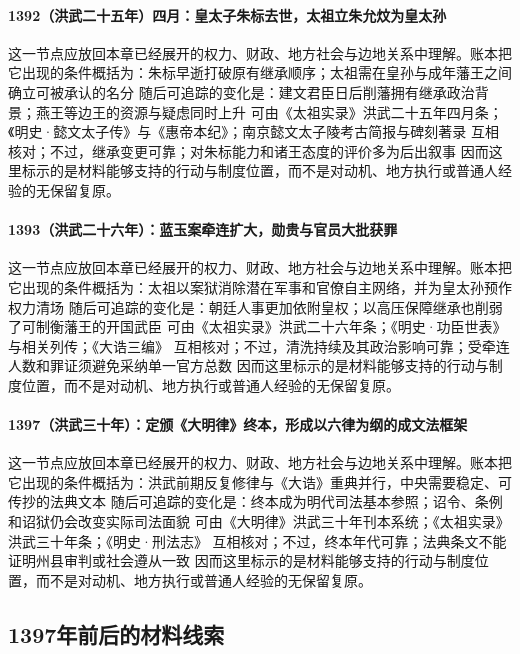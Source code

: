 \paragraph{1392（洪武二十五年）四月：皇太子朱标去世，太祖立朱允炆为皇太孙} 这一节点应放回本章已经展开的权力、财政、地方社会与边地关系中理解。账本把它出现的条件概括为：朱标早逝打破原有继承顺序；太祖需在皇孙与成年藩王之间确立可被承认的名分 随后可追踪的变化是：建文君臣日后削藩拥有继承政治背景；燕王等边王的资源与疑虑同时上升 可由《太祖实录》洪武二十五年四月条；《明史·懿文太子传》与《惠帝本纪》；南京懿文太子陵考古简报与碑刻著录 互相核对；不过，继承变更可靠；对朱标能力和诸王态度的评价多为后出叙事 因而这里标示的是材料能够支持的行动与制度位置，而不是对动机、地方执行或普通人经验的无保留复原。

\paragraph{1393（洪武二十六年）：蓝玉案牵连扩大，勋贵与官员大批获罪} 这一节点应放回本章已经展开的权力、财政、地方社会与边地关系中理解。账本把它出现的条件概括为：太祖以案狱消除潜在军事和官僚自主网络，并为皇太孙预作权力清场 随后可追踪的变化是：朝廷人事更加依附皇权；以高压保障继承也削弱了可制衡藩王的开国武臣 可由《太祖实录》洪武二十六年条；《明史·功臣世表》与相关列传；《大诰三编》 互相核对；不过，清洗持续及其政治影响可靠；受牵连人数和罪证须避免采纳单一官方总数 因而这里标示的是材料能够支持的行动与制度位置，而不是对动机、地方执行或普通人经验的无保留复原。

\paragraph{1397（洪武三十年）：定颁《大明律》终本，形成以六律为纲的成文法框架} 这一节点应放回本章已经展开的权力、财政、地方社会与边地关系中理解。账本把它出现的条件概括为：洪武前期反复修律与《大诰》重典并行，中央需要稳定、可传抄的法典文本 随后可追踪的变化是：终本成为明代司法基本参照；诏令、条例和诏狱仍会改变实际司法面貌 可由《大明律》洪武三十年刊本系统；《太祖实录》洪武三十年条；《明史·刑法志》 互相核对；不过，终本年代可靠；法典条文不能证明州县审判或社会遵从一致 因而这里标示的是材料能够支持的行动与制度位置，而不是对动机、地方执行或普通人经验的无保留复原。

\subsection{1397年前后的材料线索}

